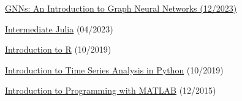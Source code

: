 \begin{cventries}
{\begin{cvitems}
            \item{\href{https://skillsoft.digitalbadges.skillsoft.com/30851258-8ee5-4f58-86ba-9a0e152c8434#gs.1s8e65}{GNNs: An Introduction to Graph Neural Networks (12/2023)}}
            \item{\href{https://www.datacamp.com/statement-of-accomplishment/course/930a810eaf9c88d856429bfabf33cb9df57e2046}{Intermediate Julia} (04/2023)}
            \item{\href{https://www.datacamp.com/statement-of-accomplishment/course/dd5746b9564cf374bcc0bb379e1801925e25259e}{Introduction to R} (10/2019)}
            \item{\href{https://www.datacamp.com/statement-of-accomplishment/course/807548ea866063da3c0083afcebf3be48d44f277}{Introduction to Time Series Analysis in Python} (10/2019)}
            \item {\href{https://www.coursera.org/account/accomplishments/verify/9G7V69L6QP}{Introduction to Programming with MATLAB} (12/2015)}
        \end{cvitems}      
    }

\end{cventries}
